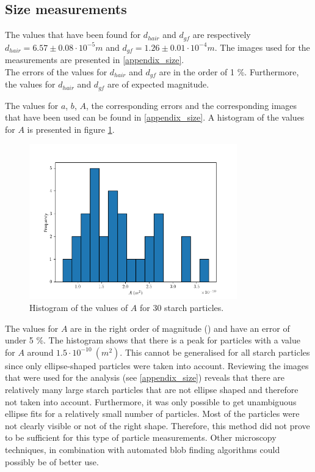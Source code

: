 \subsection{Size measurements}

The values that have been found for $d_{hair}$ and $d_{gf}$ are respectively $d_{hair} = 6.57 \pm 0.08 \cdot 10^{-5} m $ and $d_{gf} =  1.26 \pm 0.01 \cdot 10^{-4} m $. The images used for the measurements are presented in \ref{appendix_size}.\\
The errors of the values for $d_{hair}$ and $d_{gf}$ are in the order of 1 \%. Furthermore, the values for $d_{hair}$ and $d_{gf}$ are of expected magnitude.

The values for $a$, $b$, $A$, the corresponding errors and the corresponding images that have been used can be found in \ref{appendix_size}. A histogram of the values for $A$ is presented in figure \ref{fig_histogram_zetmeel}.

\begin{figure}[h!]
	\centering
    \includegraphics[width=9cm,keepaspectratio]{afbeeldingen/histogram_zetmeel.png}
    \caption{Histogram of the values of $A$ for 30 starch particles.}
    \label{fig_histogram_zetmeel}
\end{figure}

The values for $A$ are in the right order of magnitude (\cite{starch}) and have an error of under 5 \%.
The histogram shows that there is a peak for particles with a value for $A$ around $1.5 \cdot 10^{-10} \: (m^2)$. This cannot be generalised for all starch particles since only ellipse-shaped particles were taken into account. Reviewing the images that were used for the analysis (see \ref{appendix_size}) reveals that there are relatively many large starch particles that are not ellipse shaped and therefore not taken into account. Furthermore, it was only possible to get unambiguous ellipse fits for a relatively small number of particles. Most of the particles were not clearly visible or not of the right shape. Therefore, this method did not prove to be sufficient for this type of particle measurements. Other microscopy techniques, in combination with automated blob finding algorithms could possibly be of better use.

